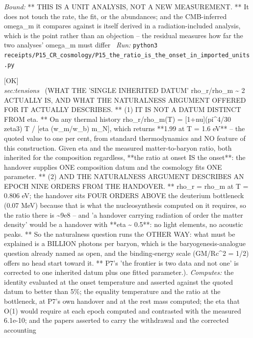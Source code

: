 \begin{description}
 \emph{Bound:} ** THIS IS A UNIT ANALYSIS, NOT A NEW MEASUREMENT. ** It does not touch the rate, the fit, or the abundances; and the CMB-inferred omega\_m it compares against is itself derived in a radiation-included analysis, which is the point rather than an objection -- the residual measures how far the two analyses' omega\_m must differ
\ \emph{Run:} \texttt{python3 receipts/P15\_CR\_cosmology/P15\_the\_ratio\_is\_the\_onset\_in\_imported\_units.py}
\item[\rcptlabel{P15_the_two_data_are_one}{P15R26}\textbf{P15R26}\quad\texttt{P15\_the\_two\_data\_are\_one}]\hfill\textsf{[OK]}\\
\textit{sec:tensions} \ (WHAT THE 'SINGLE INHERITED DATUM' rho\_r/rho\_m \textasciitilde{} 2 ACTUALLY IS, AND WHAT THE NATURALNESS ARGUMENT OFFERED FOR IT ACTUALLY DESCRIBES. ** (1) IT IS NOT A DATUM DISTINCT FROM eta. ** On any thermal history rho\_r/rho\_m(T) = [1+nu](pi\textasciicircum{}4/30 zeta3) T / [eta (w\_m/w\_b) m\_N], which returns **1.99 at T = 1.6 eV** -- the quoted value to one per cent, from standard thermodynamics and NO feature of this construction. Given eta and the measured matter-to-baryon ratio, both inherited for the composition regardless, **the ratio at onset IS the onset**: the handover supplies ONE composition datum and the cosmology fits ONE parameter. ** (2) AND THE NATURALNESS ARGUMENT DESCRIBES AN EPOCH NINE ORDERS FROM THE HANDOVER. ** rho\_r = rho\_m at T = 0.806 eV; the handover sits FOUR ORDERS ABOVE the deuterium bottleneck (0.07 MeV) because that is what the nucleosynthesis computed on it requires, so the ratio there is \textasciitilde{}9e8 -- and 'a handover carrying radiation of order the matter density' would be a handover with **eta \textasciitilde{} 0.5**: no light elements, no acoustic peaks. ** So the naturalness question runs the OTHER WAY: what must be explained is a BILLION photons per baryon, which is the baryogenesis-analogue question already named as open, and the binding-energy scale (GM/Rc\textasciicircum{}2 = 1/2) offers no head start toward it. ** P7's 'the frontier is two data and not one' is corrected to one inherited datum plus one fitted parameter.). 
\emph{Computes:} the identity evaluated at the onset temperature and asserted against the quoted datum to better than 5\%; the equality temperature and the ratio at the bottleneck, at P7's own handover and at the rest mass computed; the eta that O(1) would require at each epoch computed and contrasted with the measured 6.1e-10; and the papers asserted to carry the withdrawal and the corrected accounting

\end{description}
